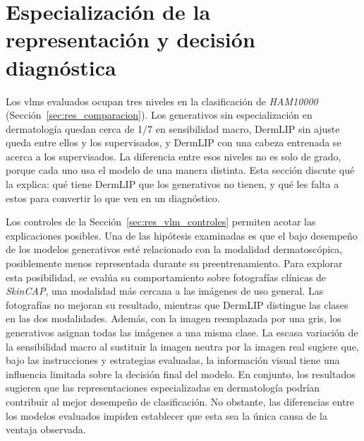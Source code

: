 \section{Especialización de la representación y decisión diagnóstica}
\label{sec:disc_representacion}

Los \glspl{vlm} evaluados ocupan tres niveles en la clasificación de \emph{HAM10000}
(Sección~\ref{sec:res_comparacion}). Los generativos sin especialización en dermatología quedan cerca de 1/7 en sensibilidad macro, DermLIP sin ajuste
queda entre ellos y los supervisados, y DermLIP con una cabeza entrenada se acerca a los supervisados. La diferencia
entre esos niveles no es solo de grado, porque cada uno usa el modelo de una manera distinta. Esta sección discute qué
la explica: qué tiene DermLIP que los generativos no tienen, y qué les falta a estos para convertir lo que ven en un
diagnóstico.

Los controles de la Sección~\ref{sec:res_vlm_controles} permiten acotar las explicaciones posibles. Una de las hipótesis examinadas es que el bajo desempeño de los modelos generativos esté relacionado con la modalidad dermatoscópica, posiblemente menos representada durante su preentrenamiento. Para explorar esta posibilidad, se evalúa su comportamiento sobre fotografías clínicas de \emph{SkinCAP}, una modalidad más cercana a las imágenes de uso general. Las fotografías no mejoran su resultado, mientras que DermLIP distingue las clases en las dos modalidades. Además, con la imagen reemplazada por una gris, los generativos asignan todas las imágenes a una misma clase. La escasa variación de la sensibilidad macro al sustituir la imagen neutra por la imagen real sugiere que, bajo las instrucciones y estrategias evaluadas, la información visual tiene una influencia limitada sobre la decisión final del modelo. En conjunto, los resultados sugieren que las representaciones especializadas en dermatología podrían contribuir al mejor desempeño de clasificación. No obstante, las diferencias entre los modelos evaluados impiden establecer que esta sea la única causa de la ventaja observada.

